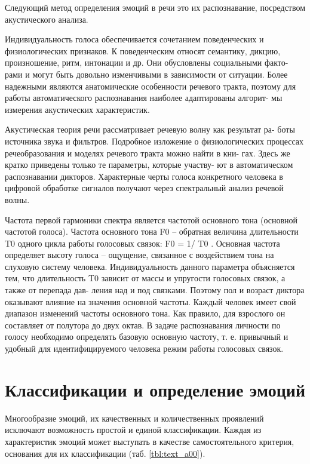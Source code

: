 Следующий метод определения эмоций в речи это их распознавание, посредством акустического анализа.

Индивидуальность голоса обеспечивается сочетанием поведенческих и
физиологических признаков. К поведенческим относят семантику, дикцию,
произношение, ритм, интонации и др. Они обусловлены социальными факто-
рами и могут быть довольно изменчивыми в зависимости от ситуации. Более
надежными являются анатомические особенности речевого тракта, поэтому
для работы автоматического распознавания наиболее адаптированы алгорит-
мы измерения акустических характеристик.

Акустическая теория речи рассматривает речевую волну как результат ра-
боты источника звука и фильтров. Подробное изложение о физиологических
процессах речеобразования и моделях речевого тракта можно найти в кни-
гах. Здесь же кратко приведены только те параметры, которые участву-
ют в автоматическом распознавании дикторов.
Характерные черты голоса конкретного человека в цифровой обработке
сигналов получают через спектральный анализ речевой волны.

Частота первой гармоники спектра является частотой основного тона
(основной частотой голоса). Частота основного тона F0 – обратная величина
длительности T0 одного цикла работы голосовых связок: F0 = 1/ T0 . Основная
частота определяет высоту голоса – ощущение, связанное с воздействием тона
на слуховую систему человека.
Индивидуальность данного параметра объясняется тем, что длительность
T0 зависит от массы и упругости голосовых связок, а также от перепада дав-
ления над и под связками. Поэтому пол и возраст диктора оказывают влияние
на значения основной частоты.
Каждый человек имеет свой диапазон изменений частоты основного тона.
Как правило, для взрослого он составляет от полутора до двух октав. В задаче
распознавания личности по голосу необходимо определять базовую основную
частоту, т. е. привычный и удобный для идентифицируемого человека режим
работы голосовых связок.

\section{Классификации и определение эмоций}

Многообразие эмоций, их качественных и количественных проявлений исключают возможность простой и единой классификации. 
Каждая из характеристик эмоций может выступать в качестве самостоятельного критерия, основания для их классификации (таб. \ref{tbl:text_a00}).

